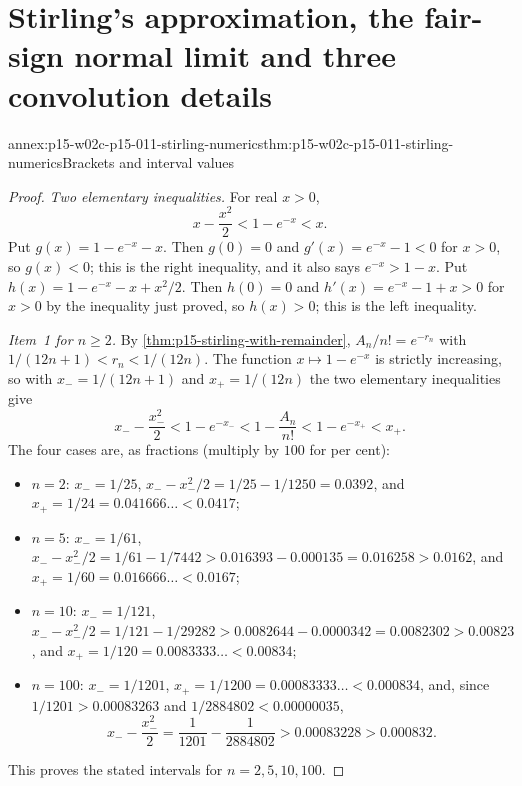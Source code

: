 \section{Stirling's approximation, the fair-sign normal limit and three convolution details}
\label{sec:annex-p15-w02c-p15-011-stirling-record}

\begin{annexitem}{annex:p15-w02c-p15-011-stirling-numerics}{thm:p15-w02c-p15-011-stirling-numerics}{Brackets and interval values}
\begin{proof}
\emph{Two elementary inequalities.} For real \(x>0\),
\[
 x-\frac{x^2}2<1-e^{-x}<x .
\]
Put \(g(x)=1-e^{-x}-x\). Then \(g(0)=0\) and \(g'(x)=e^{-x}-1<0\) for
\(x>0\), so \(g(x)<0\); this is the right inequality, and it also says
\(e^{-x}>1-x\). Put \(h(x)=1-e^{-x}-x+x^2/2\). Then \(h(0)=0\) and
\(h'(x)=e^{-x}-1+x>0\) for \(x>0\) by the inequality just proved, so
\(h(x)>0\); this is the left inequality.

\emph{Item~1 for \(n\geq2\).} By \cref{thm:p15-stirling-with-remainder},
\(A_n/n!=e^{-r_n}\) with \(1/(12n+1)<r_n<1/(12n)\). The function
\(x\mapsto1-e^{-x}\) is strictly increasing, so with
\(x_-=1/(12n+1)\) and \(x_+=1/(12n)\) the two elementary inequalities give
\[
 x_--\frac{x_-^2}2<1-e^{-x_-}<1-\frac{A_n}{n!}<1-e^{-x_+}<x_+ .
\]
The four cases are, as fractions (multiply by \(100\) for per cent):
\begin{itemize}
\item \(n=2\): \(x_-=1/25\), \(x_--x_-^2/2=1/25-1/1250=0.0392\), and
      \(x_+=1/24=0.041666\ldots<0.0417\);
\item \(n=5\): \(x_-=1/61\), \(x_--x_-^2/2=1/61-1/7442>0.016393-0.000135
      =0.016258>0.0162\), and \(x_+=1/60=0.016666\ldots<0.0167\);
\item \(n=10\): \(x_-=1/121\),
      \(x_--x_-^2/2=1/121-1/29282>0.0082644-0.0000342=0.0082302>0.00823\),
      and \(x_+=1/120=0.0083333\ldots<0.00834\);
\item \(n=100\): \(x_-=1/1201\), \(x_+=1/1200=0.00083333\ldots<0.000834\),
      and, since \(1/1201>0.00083263\) and \(1/2884802<0.00000035\),
      \[
       x_--\frac{x_-^2}2=\frac1{1201}-\frac1{2884802}
       >0.00083228>0.000832 .
      \]
\end{itemize}
This proves the stated intervals for \(n=2,5,10,100\).


\end{proof}
\end{annexitem}
